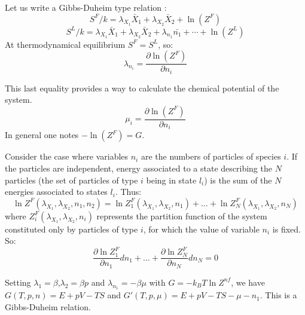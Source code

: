 \documentclass[12pt]{book}
\begin{document}
Let us write a Gibbs-Duheim type relation
:
\begin{equation}
S^{F}/k=\lambda_{X_1}\bar X_1+\lambda_{X_2}\bar X_2+\ln (Z^{F})
\end{equation}
\begin{equation}
S^{L}/k=\lambda_{X_1}\bar X_1+\lambda_{X_2}\bar X_2+\lambda_{n_1}\bar{n_1}+\cdots+\ln (Z^{L})
\end{equation}
At thermodynamical equilibrium $S^{F}=S^{L}$, so:
\begin{equation}
\lambda_{n_i}=\frac{\partial \ln (Z^{F})}{\partial n_i}
\end{equation}
\begin{exmp}
This last equality provides a way to calculate the chemical potential of the
system. 
\begin{equation}
\mu_i=\frac{\partial \ln (Z^{F})}{\partial n_i}
\end{equation}
In general one notes $-\ln(Z^{F})=G$.
\end{exmp}
\begin{exmp}
Consider the case where variables $n_i$ are the numbers of particles of species
$i$. If the particles are independent, energy associated to a state describing
the $N$ particles (the set of particles of type $i$ being in state $l_i$) is
the sum of the $N$ energies associated to states $l_i$. Thus:
\begin{equation}
\ln Z^F(\lambda_{X_1},\lambda_{X_2},n_1,n_2)=\ln
Z^F_1(\lambda_{X_1},\lambda_{X_2},n_1)+\dots+\ln
Z^F_N(\lambda_{X_1},\lambda_{X_2},n_N) 
\end{equation}
where $Z^F_i(\lambda_{X_1},\lambda_{X_2},n_i)$ represents the partition
function of the system constituted only by particles of type $i$, for which
the value of variable $n_i$ is fixed. So:
\begin{equation}
\frac{\partial \ln Z^F_1}{\partial n_1} dn_1+\dots+\frac{\partial \ln
Z^F_N}{\partial n_N} dn_N=0 
\end{equation}
\end{exmp}
\begin{rem}
Setting $\lambda_1=\beta$,$\lambda_2=\beta p$ and $\lambda_{n_1}=-\beta\mu$
with $G=-k_BT\ln Z^{nf}$, we have $G(T,p,n)=E+pV-TS$ and
$G'(T,p,\mu)=E+pV-TS-\mu-{n_1}$. This is a Gibbs-Duheim relation.
\end{rem}
\end{document}
